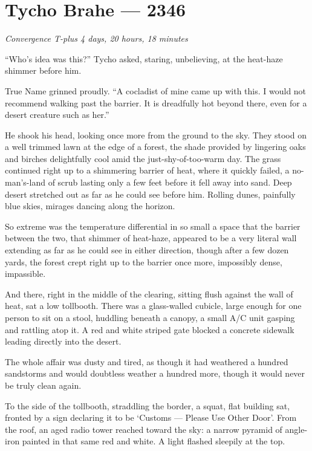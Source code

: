\hypertarget{tycho-brahe-2346}{%
\chapter{Tycho Brahe — 2346}\label{tycho-brahe-2346}}

\begin{center}
\emph{Convergence T-plus 4 days, 20 hours, 18 minutes}
\end{center}

\noindent ``Who's idea was this?'' Tycho asked, staring, unbelieving, at the heat-haze shimmer before him.

True Name grinned proudly. ``A cocladist of mine came up with this. I would not recommend walking past the barrier. It is dreadfully hot beyond there, even for a desert creature such as her.''

He shook his head, looking once more from the ground to the sky. They stood on a well trimmed lawn at the edge of a forest, the shade provided by lingering oaks and birches delightfully cool amid the just-shy-of-too-warm day. The grass continued right up to a shimmering barrier of heat, where it quickly failed, a no-man's-land of scrub lasting only a few feet before it fell away into sand. Deep desert stretched out as far as he could see before him. Rolling dunes, painfully blue skies, mirages dancing along the horizon.

So extreme was the temperature differential in so small a space that the barrier between the two, that shimmer of heat-haze, appeared to be a very literal wall extending as far as he could see in either direction, though after a few dozen yards, the forest crept right up to the barrier once more, impossibly dense, impassible.

And there, right in the middle of the clearing, sitting flush against the wall of heat, sat a low tollbooth. There was a glass-walled cubicle, large enough for one person to sit on a stool, huddling beneath a canopy, a small A/C unit gasping and rattling atop it. A red and white striped gate blocked a concrete sidewalk leading directly into the desert.

The whole affair was dusty and tired, as though it had weathered a hundred sandstorms and would doubtless weather a hundred more, though it would never be truly clean again.

To the side of the tollbooth, straddling the border, a squat, flat building sat, fronted by a sign declaring it to be `Customs — Please Use Other Door'. From the roof, an aged radio tower reached toward the sky: a narrow pyramid of angle-iron painted in that same red and white. A light flashed sleepily at the top.

